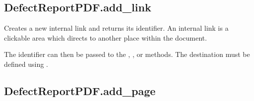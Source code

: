 \documentclass[letterpaper,10pt,english]{sphinxmanual}
\begin{document}
\begin{fulllineitems}
\begin{fulllineitems}
\begin{quote}
\begin{description}
\begin{itemize}
\end{itemize}

\end{description}\end{quote}

\end{fulllineitems}



\subsection{DefectReportPDF.add\_link}
\label{\detokenize{generated/quality_assessment.quality_pdf_report.DefectReportPDF.add_link:defectreportpdf-add-link}}\label{\detokenize{generated/quality_assessment.quality_pdf_report.DefectReportPDF.add_link::doc}}

\begin{fulllineitems}
\label{\detokenize{generated/quality_assessment.quality_pdf_report.DefectReportPDF.add_link:quality_assessment.quality_pdf_report.DefectReportPDF.add_link}}
\sphinxAtStartPar
Creates a new internal link and returns its identifier.
An internal link is a clickable area which directs to another place within the document.

\sphinxAtStartPar
The identifier can then be passed to the , ,  or  methods.
The destination must be defined using .

\end{fulllineitems}



\subsection{DefectReportPDF.add\_page}
\label{\detokenize{generated/quality_assessment.quality_pdf_report.DefectReportPDF.add_page:defectreportpdf-add-page}}\label{\detokenize{generated/quality_assessment.quality_pdf_report.DefectReportPDF.add_page::doc}}


\end{fulllineitems}
\end{document}
